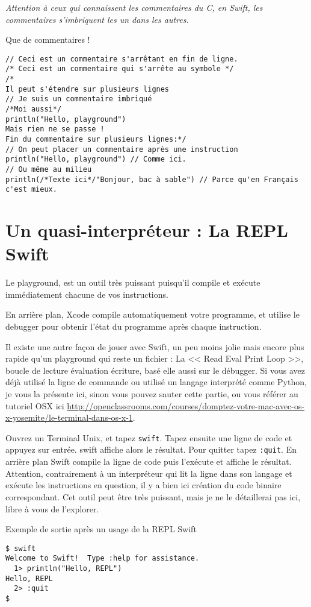 \emph{Attention à ceux qui connaissent les commentaires du C, en Swift, les commentaires
s'imbriquent les un dans les autres.}
\begin{listing}[h]
\caption{Que de commentaires !}
\begin{verbatim}
// Ceci est un commentaire s'arrêtant en fin de ligne.
/* Ceci est un commentaire qui s'arrête au symbole */
/*
Il peut s'étendre sur plusieurs lignes
// Je suis un commentaire imbriqué
/*Moi aussi*/
println("Hello, playground")
Mais rien ne se passe !
Fin du commentaire sur plusieurs lignes:*/
// On peut placer un commentaire après une instruction
println("Hello, playground") // Comme ici.
// Ou même au milieu
println(/*Texte ici*/"Bonjour, bac à sable") // Parce qu'en Français c'est mieux.
\end{verbatim}
\end{listing}
\section{Un quasi-interpréteur : La REPL Swift}
Le playground, est un outil très puissant puisqu’il compile et exécute immédiatement
chacune de vos instructions.

En arrière plan, Xcode compile automatiquement votre programme, et utilise le debugger
pour obtenir l’état du programme après chaque instruction.

Il existe une autre façon de jouer avec Swift, un peu moins jolie mais encore plus rapide
qu’un playground qui reste un fichier : La << Read Eval Print Loop >>, boucle de lecture évaluation écriture, basé elle aussi sur le
débugger. Si vous avez déjà utilisé la ligne de commande ou utilisé un langage interprété
comme Python, je vous la présente ici, sinon vous pouvez sauter cette partie, ou vous
référer au tutoriel OSX ici \url{http://openclassrooms.com/courses/domptez-votre-mac-avec-os-x-yosemite/le-terminal-dans-os-x-1}.

Ouvrez un Terminal Unix, et tapez \verb"swift".
Tapez ensuite une ligne de code et appuyez sur entrée.
swift affiche alors le résultat.
Pour quitter tapez \verb":quit".
En arrière plan Swift compile la ligne de code puis l'exécute et affiche le résultat.
Attention, contrairement à un interpréteur qui lit la ligne dans son langage et exécute
les instructions en question, il y a bien ici création du code binaire correspondant.
Cet outil peut être très puissant, mais je ne le détaillerai pas ici, libre à vous de l’explorer.
\begin{listing}[h]
\caption{Exemple de sortie après un usage de la REPL Swift}
\begin{verbatim}
$ swift
Welcome to Swift!  Type :help for assistance.
  1> println("Hello, REPL")
Hello, REPL
  2> :quit
$
\end{verbatim}
\end{listing}